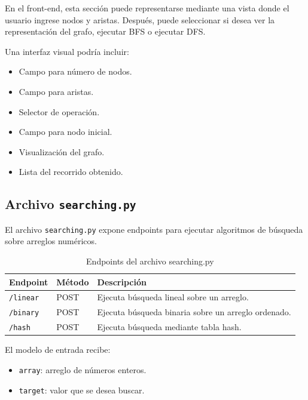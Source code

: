 \documentclass[12pt]{article}
\begin{document}
En el front-end, esta sección puede representarse mediante una vista donde el usuario ingrese nodos y aristas. Después, puede seleccionar si desea ver la representación del grafo, ejecutar BFS o ejecutar DFS.

Una interfaz visual podría incluir:

\begin{itemize}
	\item Campo para número de nodos.
	\item Campo para aristas.
	\item Selector de operación.
	\item Campo para nodo inicial.
	\item Visualización del grafo.
	\item Lista del recorrido obtenido.
\end{itemize}

\subsection{Archivo \texttt{searching.py}}

El archivo \texttt{searching.py} expone endpoints para ejecutar algoritmos de búsqueda sobre arreglos numéricos.

\begin{table}[H]
	\centering
	\begin{tabular}{|p{4cm}|p{4cm}|p{6cm}|}
		\hline
		\textbf{Endpoint} & \textbf{Método} & \textbf{Descripción} \\
		\hline
		\texttt{/linear} & POST & Ejecuta búsqueda lineal sobre un arreglo. \\
		\hline
		\texttt{/binary} & POST & Ejecuta búsqueda binaria sobre un arreglo ordenado. \\
		\hline
		\texttt{/hash} & POST & Ejecuta búsqueda mediante tabla hash. \\
		\hline
	\end{tabular}
	\caption{Endpoints del archivo searching.py}
\end{table}

El modelo de entrada recibe:

\begin{itemize}
	\item \texttt{array}: arreglo de números enteros.
	\item \texttt{target}: valor que se desea buscar.
\end{itemize}
\end{document}
